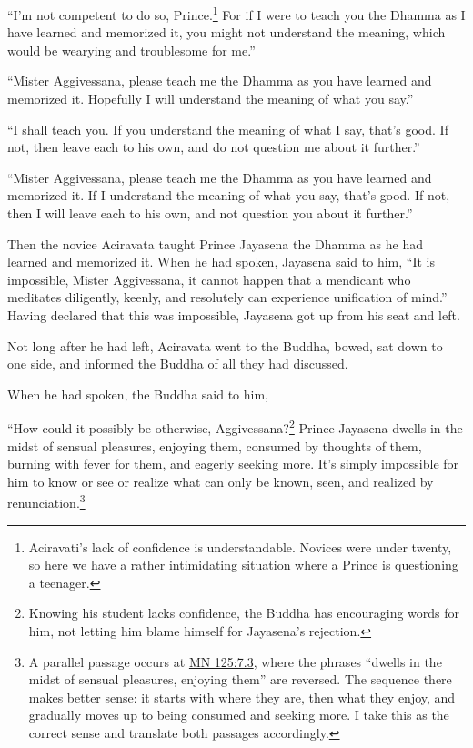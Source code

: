 \documentclass[12pt,openany]{book}%
\begin{document}
“I’m not competent to do so, Prince.\footnote{Aciravati’s lack of confidence is understandable. Novices were under twenty, so here we have a rather intimidating situation where a Prince is questioning a teenager. } For if I were to teach you the Dhamma as I have learned and memorized it, you might not understand the meaning, which would be wearying and troublesome for me.” 

“Mister Aggivessana, please teach me the Dhamma as you have learned and memorized it. Hopefully I will understand the meaning of what you say.” 

“I shall teach you. If you understand the meaning of what I say, that’s good. If not, then leave each to his own, and do not question me about it further.” 

“Mister Aggivessana, please teach me the Dhamma as you have learned and memorized it. If I understand the meaning of what you say, that’s good. If not, then I will leave each to his own, and not question you about it further.” 

Then the novice Aciravata taught Prince Jayasena the Dhamma as he had learned and memorized it. When he had spoken, Jayasena said to him, “It is impossible, Mister Aggivessana, it cannot happen that a mendicant who meditates diligently, keenly, and resolutely can experience unification of mind.” Having declared that this was impossible, Jayasena got up from his seat and left. 

Not long after he had left, Aciravata went to the Buddha, bowed, sat down to one side, and informed the Buddha of all they had discussed. 

When he had spoken, the Buddha said to him, 

“How could it possibly be otherwise, Aggivessana?\footnote{Knowing his student lacks confidence, the Buddha has encouraging words for him, not letting him blame himself for Jayasena’s rejection. } Prince Jayasena dwells in the midst of sensual pleasures, enjoying them, consumed by thoughts of them, burning with fever for them, and eagerly seeking more. It’s simply impossible for him to know or see or realize what can only be known, seen, and realized by renunciation.\footnote{A parallel passage occurs at \href{https://suttacentral.net/mn125/en/sujato\#7.3}{MN 125:7.3}, where the phrases “dwells in the midst of sensual pleasures, enjoying them” are reversed. The sequence there makes better sense: it starts with where they are, then what they enjoy, and gradually moves up to being consumed and seeking more. I take this as the correct sense and translate both passages accordingly. } 
\end{document}
